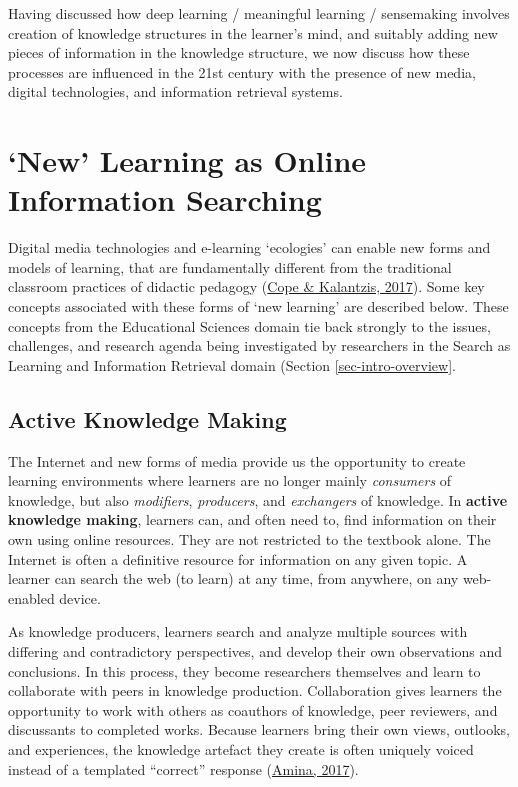 \documentclass[letterpaper, nobind]{templates/ociamthesis}
\begin{document}
Having discussed how deep learning / meaningful learning / sensemaking
involves creation of knowledge structures in the learner's mind, and
suitably adding new pieces of information in the knowledge structure, we
now discuss how these processes are influenced in the 21st century with
the presence of new media, digital technologies, and information
retrieval systems.

\hypertarget{sec-bg-learn-active-knowledge-multiliteracy}{%
\section{`New' Learning as Online Information Searching}\label{sec-bg-learn-active-knowledge-multiliteracy}}

Digital media technologies and e-learning `ecologies' can enable new
forms and models of learning, that are fundamentally different from the
traditional classroom practices of didactic pedagogy
(\protect\hyperlink{ref-cope2017elearningc}{Cope \& Kalantzis, 2017}). Some key concepts associated with these forms of
`new learning' are described below. These concepts from the Educational
Sciences domain tie back strongly to the issues, challenges, and
research agenda being investigated by researchers in the Search as
Learning and Information Retrieval domain (Section \ref{sec-intro-overview}.

\hypertarget{sec-bg-learn-active-knowledge-making}{%
\subsection{Active Knowledge Making}\label{sec-bg-learn-active-knowledge-making}}

The Internet and new forms of media provide us the opportunity to create
learning environments where learners are no longer mainly \emph{consumers} of
knowledge, but also \emph{modifiers}, \emph{producers}, and \emph{exchangers} of
knowledge. In \textbf{active knowledge making}, learners can, and often need
to, find information on their own using online resources. They are not
restricted to the textbook alone. The Internet is often a definitive
resource for information on any given topic. A learner can search the
web (to learn) at any time, from anywhere, on any web-enabled device.

As knowledge producers, learners search and analyze multiple sources
with differing and contradictory perspectives, and develop their own
observations and conclusions. In this process, they become researchers
themselves and learn to collaborate with peers in knowledge production.
Collaboration gives learners the opportunity to work with others as
coauthors of knowledge, peer reviewers, and discussants to completed
works. Because learners bring their own views, outlooks, and
experiences, the knowledge artefact they create is often uniquely voiced
instead of a templated ``correct'' response (\protect\hyperlink{ref-amina2017active}{Amina, 2017}).
\end{document}
